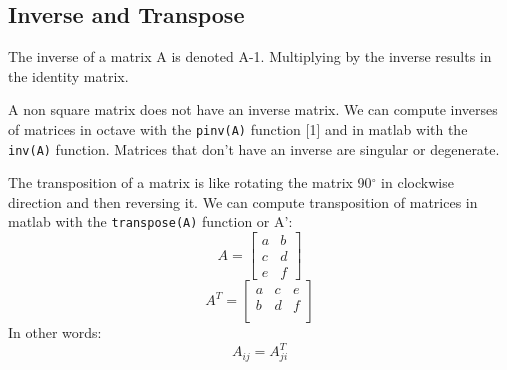 \subsection*{Inverse and Transpose}
The inverse of a matrix A is denoted A-1. Multiplying by the inverse results in the identity matrix.

A non square matrix does not have an inverse matrix. We can compute inverses of matrices in octave with the \verb|pinv(A)| function [1] and in matlab with the \verb|inv(A)| function. Matrices that don't have an inverse are singular or degenerate.

The transposition of a matrix is like rotating the matrix 90$^{\circ}$  in clockwise direction and then reversing it. We can compute transposition of matrices in matlab with the \verb|transpose(A)| function or A':
\[
A =  \begin{bmatrix}  a & b \\   c & d \\   e & f \end{bmatrix}
\]
\[
A^T = \begin{bmatrix} a & c & e \\ b & d & f \\ \end{bmatrix}
\]
In other words:
\[
A_{ij} = A^T_{ji}
\]